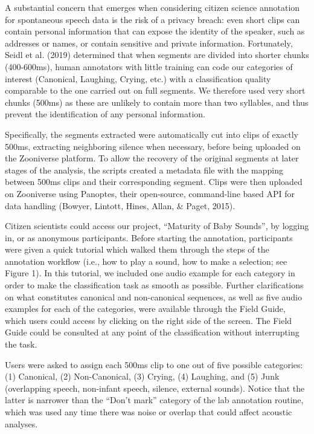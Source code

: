 \documentclass[english,,man]{apa6}
\begin{document}
A substantial concern that emerges when considering citizen science annotation for spontaneous speech data is the risk of a privacy breach: even short clips can contain personal information that can expose the identity of the speaker, such as addresses or names, or contain sensitive and private information. Fortunately, Seidl et al. (2019) determined that when segments are divided into shorter chunks (400-600ms), human annotators with little training can code our categories of interest (Canonical, Laughing, Crying, etc.) with a classification quality comparable to the one carried out on full segments. We therefore used very short chunks (500ms) as these are unlikely to contain more than two syllables, and thus prevent the identification of any personal information.

Specifically, the segments extracted were automatically cut into clips of exactly 500ms, extracting neighboring silence when necessary, before being uploaded on the Zooniverse platform. To allow the recovery of the original segments at later stages of the analysis, the scripts created a metadata file with the mapping between 500ms clips and their corresponding segment. Clips were then uploaded on Zooniverse using Panoptes, their open-source, command-line based API for data handling (Bowyer, Lintott, Hines, Allan, \& Paget, 2015).

Citizen scientists could access our project, \enquote{Maturity of Baby Sounds}, by logging in, or as anonymous participants. Before starting the annotation, participants were given a quick tutorial which walked them through the steps of the annotation workflow (i.e., how to play a sound, how to make a selection; see Figure 1). In this tutorial, we included one audio example for each category in order to make the classification task as smooth as possible. Further clarifications on what constitutes canonical and non-canonical sequences, as well as five audio examples for each of the categories, were available through the Field Guide, which users could access by clicking on the right side of the screen. The Field Guide could be consulted at any point of the classification without interrupting the task.

Users were asked to assign each 500ms clip to one out of five possible categories: (1) Canonical, (2) Non-Canonical, (3) Crying, (4) Laughing, and (5) Junk (overlapping speech, non-infant speech, silence, external sounds). Notice that the latter is narrower than the \enquote{Don't mark} category of the lab annotation routine, which was used any time there was noise or overlap that could affect acoustic analyses.
\end{document}
